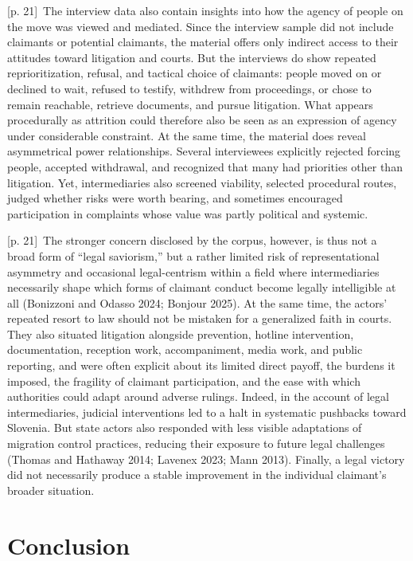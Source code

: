 \documentclass[10pt,a4paper]{article}
\begin{document}
{\scriptsize\color{gray} [p. 21]}\ The interview data also contain insights into how the agency of people on the move was viewed and mediated. Since the interview sample did not include claimants or potential claimants, the material offers only indirect access to their attitudes toward litigation and courts. But the interviews do show repeated reprioritization, refusal, and tactical choice of claimants: people moved on or declined to wait, refused to testify, withdrew from proceedings, or chose to remain reachable, retrieve documents, and pursue litigation. What appears procedurally as attrition could therefore also be seen as an expression of agency under considerable constraint. At the same time, the material does reveal asymmetrical power relationships. Several interviewees explicitly rejected forcing people, accepted withdrawal, and recognized that many had priorities other than litigation. Yet, intermediaries also screened viability, selected procedural routes, judged whether risks were worth bearing, and sometimes encouraged participation in complaints whose value was partly political and systemic.\par
{\scriptsize\color{gray} [p. 21]}\ The stronger concern disclosed by the corpus, however, is thus not a broad form of “legal saviorism,” but a rather limited risk of representational asymmetry and occasional legal-centrism within a field where intermediaries necessarily shape which forms of claimant conduct become legally intelligible at all (Bonizzoni and Odasso 2024; Bonjour 2025). At the same time, the actors’ repeated resort to law should not be mistaken for a generalized faith in courts. They also situated litigation alongside prevention, hotline intervention, documentation, reception work, accompaniment, media work, and public reporting, and were often explicit about its limited direct payoff, the burdens it imposed, the fragility of claimant participation, and the ease with which authorities could adapt around adverse rulings. Indeed, in the account of legal intermediaries, judicial interventions led to a halt in systematic pushbacks toward Slovenia. But state actors also responded with less visible adaptations of migration control practices, reducing their exposure to future legal challenges (Thomas and Hathaway 2014; Lavenex 2023; Mann 2013). Finally, a legal victory did not necessarily produce a stable improvement in the individual claimant’s broader situation.\par
{}\section*{Conclusion}
\end{document}
